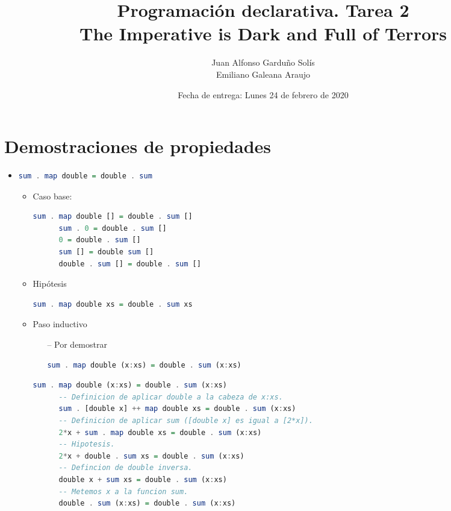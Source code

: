 \documentclass[spanish,12pt,letterpaper]{article}
\title{Programación declarativa. Tarea 2\\
\Huge{The Imperative is Dark and Full of Terrors}}
\author{Juan Alfonso Garduño Solís\\
  Emiliano Galeana Araujo}
\affil{Facultad de ciencias, UNAM}
\date{Fecha de entrega: Lunes 24 de febrero de 2020}
\begin{document}
\maketitle

\section{Demostraciones de propiedades}
\begin{itemize}
\item
  \begin{lstlisting}[language=Haskell]
    sum . map double = double . sum
  \end{lstlisting}
  \begin{itemize}
    \item Caso base:
    \begin{lstlisting}[language=Haskell]
      sum . map double [] = double . sum []
      sum . 0 = double . sum []
      0 = double . sum []
      sum [] = double sum []
      double . sum [] = double . sum []
    \end{lstlisting}
  \item Hipótesis
    \begin{lstlisting}[language=Haskell]
      sum . map double xs = double . sum xs
    \end{lstlisting}
  \item Paso inductivo
    \begin{itemize}
    \item [--] Por demostrar
      \begin{lstlisting}[language=Haskell]
        sum . map double (x:xs) = double . sum (x:xs)
      \end{lstlisting}
    \end{itemize}
    \begin{lstlisting}[language=Haskell]
      sum . map double (x:xs) = double . sum (x:xs)
      -- Definicion de aplicar double a la cabeza de x:xs.
      sum . [double x] ++ map double xs = double . sum (x:xs)
      -- Definicion de aplicar sum ([double x] es igual a [2*x]).
      2*x + sum . map double xs = double . sum (x:xs)
      -- Hipotesis.
      2*x + double . sum xs = double . sum (x:xs)
      -- Defincion de double inversa.
      double x + sum xs = double . sum (x:xs)
      -- Metemos x a la funcion sum.
      double . sum (x:xs) = double . sum (x:xs)
    \end{lstlisting}
  \end{itemize}
  

\end{itemize}
\end{document}
